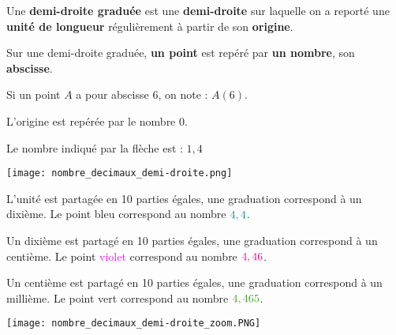 \documentclass[a4paper,dvipsnames]{article}
\begin{document}
\begin{Def}
Une \textbf{demi-droite graduée} est une \textbf{demi-droite} sur laquelle on a reporté une \textbf{unité de longueur} régulièrement à partir de son \textbf{origine}.

Sur une demi-droite graduée, \textbf{un point} est repéré par \textbf{un nombre}, son \textbf{abscisse}.

Si un point $A$ a pour abscisse $6$, on note : $A(6)$.

L'origine est repérée par le nombre $0$.

\begin{center}
\end{center}
\end{Def}

\begin{Ex}
Le nombre indiqué par la flèche est : $1,4$
\begin{center}
\texttt{[image: nombre\_decimaux\_demi-droite.png]}
\end{center}
\end{Ex}

\begin{Mt}
L'unité est partagée en 10 parties égales, une graduation correspond à un dixième. Le point \textcolor{sacado_blue}{bleu} correspond au nombre $\textcolor{sacado_blue}{4,4}$.

Un dixième est partagé en 10 parties égales, une graduation correspond à un centième. Le point \textcolor{magenta}{violet} correspond au nombre $\textcolor{magenta}{4,46}$.

Un centième est partagé en 10 parties égales, une graduation correspond à un millième. Le point \textcolor{sacado_green}{vert} correspond au nombre $\textcolor{sacado_green}{4,465}$.
\begin{center}
\texttt{[image: nombre\_decimaux\_demi-droite\_zoom.PNG]}
\end{center}
\end{Mt}
\end{document}

